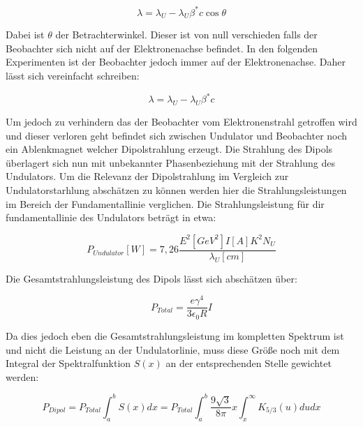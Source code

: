 \begin{equation*}
    \lambda = \lambda_U -\lambda_U \beta^*c \cos{\theta}
\end{equation*}

Dabei ist $\theta$ der Betrachterwinkel. Dieser ist von null verschieden falls der Beobachter sich 
nicht auf der Elektronenachse befindet. In den folgenden Experimenten ist der Beobachter jedoch immer
auf der Elektronenachse. Daher lässt sich vereinfacht schreiben:

\begin{equation*}
    \lambda = \lambda_U -\lambda_U \beta^*c
\end{equation*}

Um jedoch zu verhindern das der Beobachter vom Elektronenstrahl getroffen wird und dieser verloren geht
befindet sich zwischen Undulator und Beobachter noch ein Ablenkmagnet welcher Dipolstrahlung erzeugt.
Die Strahlung des Dipols überlagert sich nun mit unbekannter Phasenbeziehung mit der Strahlung des 
Undulators. Um die Relevanz der Dipolstrahlung im Vergleich zur Undulatorstarhlung abschätzen zu können
werden hier die Strahlungsleistungen im Bereich der Fundamentallinie verglichen.
Die Strahlungsleistung für dir fundamentallinie des Undulators beträgt in etwa:

\begin{equation*}
    P_{Undulator} [W] = 7,26\frac{E^2[GeV^2]I[A]K^2N_U}{\lambda_U[cm]} 
\end{equation*}

Die Gesamtstrahlungsleistung des Dipols lässt sich abschätzen über:

\begin{equation}
    P_{Total} = \frac{e\gamma^4}{3\epsilon_0R}I
\end{equation}

Da dies jedoch eben die Gesamtstrahlungsleistung im kompletten Spektrum ist und nicht die Leistung an der 
Undulatorlinie, muss diese Größe noch mit dem Integral der Spektralfunktion $S(x)$ an der entsprechenden 
Stelle gewichtet werden:

\begin{equation*}
    P_{Dipol} = P_{Total} \int_{a}^{b}S(x)dx = P_{Total} \int_{a}^{b} \frac{9\sqrt{3}}{8\pi}x\int_{x}^{\infty}K_{5/3}(u)du dx
\end{equation*}

